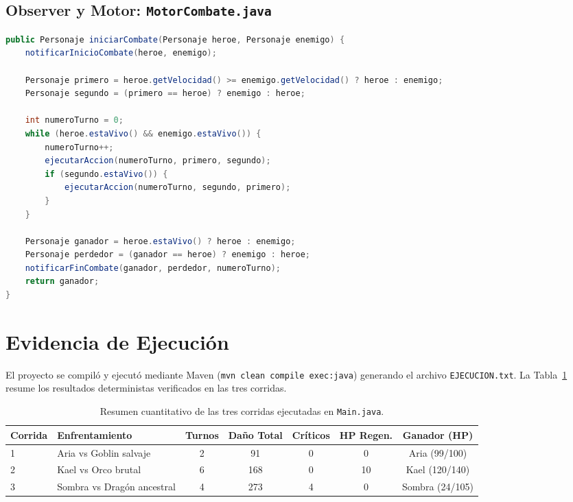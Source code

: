 \documentclass[12pt,letterpaper]{article}
\begin{document}
\subsection{Observer y Motor: \texttt{MotorCombate.java}}
\begin{lstlisting}[language=Java, caption={Orquestación de turnos y notificación desacoplada a observadores.}]
public Personaje iniciarCombate(Personaje heroe, Personaje enemigo) {
    notificarInicioCombate(heroe, enemigo);

    Personaje primero = heroe.getVelocidad() >= enemigo.getVelocidad() ? heroe : enemigo;
    Personaje segundo = (primero == heroe) ? enemigo : heroe;

    int numeroTurno = 0;
    while (heroe.estaVivo() && enemigo.estaVivo()) {
        numeroTurno++;
        ejecutarAccion(numeroTurno, primero, segundo);
        if (segundo.estaVivo()) {
            ejecutarAccion(numeroTurno, segundo, primero);
        }
    }

    Personaje ganador = heroe.estaVivo() ? heroe : enemigo;
    Personaje perdedor = (ganador == heroe) ? enemigo : heroe;
    notificarFinCombate(ganador, perdedor, numeroTurno);
    return ganador;
}
\end{lstlisting}

\section{Evidencia de Ejecución}

El proyecto se compiló y ejecutó mediante Maven (\texttt{mvn clean compile exec:java}) generando el archivo \texttt{EJECUCION.txt}. La Tabla~\ref{tab:resumen_corridas} resume los resultados deterministas verificados en las tres corridas.

\begin{table}[H]
    \centering
    \caption{Resumen cuantitativo de las tres corridas ejecutadas en \texttt{Main.java}.}
    \label{tab:resumen_corridas}
    \begin{tabular}{llccccc}
        \toprule
        \textbf{Corrida} & \textbf{Enfrentamiento} & \textbf{Turnos} & \textbf{Daño Total} & \textbf{Críticos} & \textbf{HP Regen.} & \textbf{Ganador (HP)} \\
        \midrule
        1 & Aria vs Goblin salvaje     & 2 & 91  & 0 & 0  & Aria (99/100) \\
        2 & Kael vs Orco brutal        & 6 & 168 & 0 & 10 & Kael (120/140) \\
        3 & Sombra vs Dragón ancestral & 4 & 273 & 4 & 0  & Sombra (24/105) \\
        \bottomrule
    \end{tabular}
\end{table}
\end{document}
